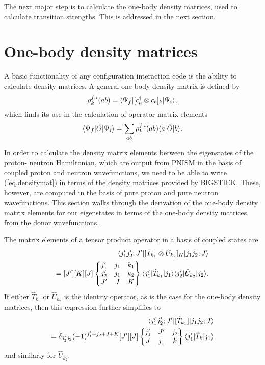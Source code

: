 The next major step is to calculate the one-body density matrices,  
used to calculate transition strengths. This is addressed in the next section.


\section{One-body density matrices}
A basic functionality of any configuration interaction code is the ability to 
calculate density matrices.
A general one-body density matrix is defined by
\begin{equation}\label{eq.densitymat}
	\rho_k^{f,i}(ab)=\langle \Psi_f|[c_a^{\dagger}\otimes c_b]_k|\Psi_i\rangle,
\end{equation}
which finds its use in the calculation of operator matrix elements
\begin{equation}
	\langle \Psi_f|\hat{O}|\Psi_i\rangle=\sum_{ab} \rho_k^{f,i}(ab) \langle a|\hat{O}|b\rangle.
\end{equation}

In order to calculate the density matrix elements between the eigenstates of the proton-
neutron Hamiltonian,
which are output from PNISM in the basis of coupled proton and neutron wavefunctions,
we need to be able to write (\ref{eq.densitymat}) in terms of the density matrices 
provided by BIGSTICK.
These, however, are computed in the basis of pure proton and pure neutron wavefunctions.
This section walks through the derivation of the one-body density matrix elements for 
our eigenstates
in terms of the one-body density matrices from the donor wavefunctions.

The matrix elements of a tensor product operator in a basis of coupled states 
are\cite{Edmonds}
\begin{equation} \begin{split}
\langle j_1'j_2';J'|[\hat{T}_{k_1}\otimes \hat{U}_{k_2}]_K|j_1j_2;J\rangle \\
=[J'][K][J]
\begin{Bmatrix} 
j_1' & j_1 & k_1 \\ 
j_2' & j_1 & k_2 \\
J' & J & K
\end{Bmatrix}
\langle j_1'|\hat{T}_{k_1}|j_1\rangle\langle j_2'|\hat{U}_{k_2}|j_2\rangle.
\end{split} \end{equation}
If either $\hat{T}_{k_1}$ or $\hat{U}_{k_2}$ is the identity operator, 
as is the case for the 
one-body density matrices, then this expression further simplifies to 
\begin{equation}\begin{split}
\langle j_1'j_2';J'|[\hat{T}_{k_1}]|j_1j_2;J\rangle \\
= \delta_{j_2'j_2}(-1)^{j_1'+j_2+J+K}[J'][J]
\begin{Bmatrix} 
j_1' & J' & j_2 \\ 
J & j_1 & k
\end{Bmatrix}
\langle j_1'|\hat{T}_k|j_1\rangle
\end{split}\end{equation}
and similarly for $\hat{U}_{k_2}$.

